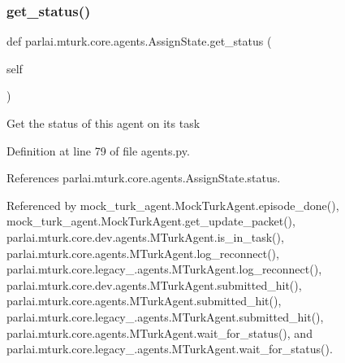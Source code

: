 \subsubsection{\texorpdfstring{get\+\_\+status()}{get\_status()}}
{\footnotesize\ttfamily def parlai.\+mturk.\+core.\+agents.\+Assign\+State.\+get\+\_\+status (\begin{DoxyParamCaption}\item[{}]{self }\end{DoxyParamCaption})}

\begin{DoxyVerb}Get the status of this agent on its task\end{DoxyVerb}
 

Definition at line 79 of file agents.\+py.



References parlai.\+mturk.\+core.\+agents.\+Assign\+State.\+status.



Referenced by mock\+\_\+turk\+\_\+agent.\+Mock\+Turk\+Agent.\+episode\+\_\+done(), mock\+\_\+turk\+\_\+agent.\+Mock\+Turk\+Agent.\+get\+\_\+update\+\_\+packet(), parlai.\+mturk.\+core.\+dev.\+agents.\+M\+Turk\+Agent.\+is\+\_\+in\+\_\+task(), parlai.\+mturk.\+core.\+agents.\+M\+Turk\+Agent.\+log\+\_\+reconnect(), parlai.\+mturk.\+core.\+legacy\+\_.\+agents.\+M\+Turk\+Agent.\+log\+\_\+reconnect(), parlai.\+mturk.\+core.\+dev.\+agents.\+M\+Turk\+Agent.\+submitted\+\_\+hit(), parlai.\+mturk.\+core.\+agents.\+M\+Turk\+Agent.\+submitted\+\_\+hit(), parlai.\+mturk.\+core.\+legacy\+\_.\+agents.\+M\+Turk\+Agent.\+submitted\+\_\+hit(), parlai.\+mturk.\+core.\+agents.\+M\+Turk\+Agent.\+wait\+\_\+for\+\_\+status(), and parlai.\+mturk.\+core.\+legacy\+\_.\+agents.\+M\+Turk\+Agent.\+wait\+\_\+for\+\_\+status().

